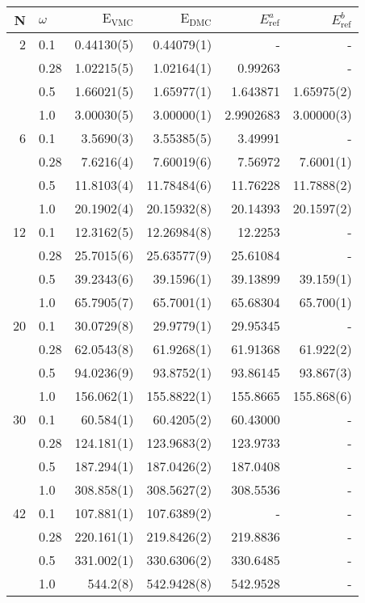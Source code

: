 \begin{table}
\label{tab:QDotsResultsAll}
\begin{center}
\begin{tabular}{rl|rrrr}
    N     & $\omega$ & $\mathrm{E_{VMC}}$ & $\mathrm{E_{DMC}}$ & $E_\mathrm{ref}^a$& $E_\mathrm{ref}^b$\\
\hline\hline
    2     &   0.1    & 0.44130(5)  & 0.44079(1)  &- & -           \\
          &   0.28   & 1.02215(5)  & 1.02164(1)  &0.99263 & -           \\
          &   0.5    & 1.66021(5)  & 1.65977(1)  &1.643871 & 1.65975(2) \\
          &   1.0    & 3.00030(5)  & 3.00000(1)  &2.9902683 & 3.00000(3)  \\
\hline
    6     &   0.1    &  3.5690(3)  &  3.55385(5)  &3.49991 & -          \\
          &   0.28   &  7.6216(4)  &  7.60019(6)  &7.56972 & 7.6001(1)  \\
          &   0.5    & 11.8103(4)  & 11.78484(6)  &11.76228 & 11.7888(2) \\
          &   1.0    & 20.1902(4)  & 20.15932(8)  &20.14393 & 20.1597(2) \\
\hline
    12    &   0.1    & 12.3162(5)  & 12.26984(8) &12.2253 & -           \\
          &   0.28   & 25.7015(6)  & 25.63577(9) &25.61084 & -          \\
          &   0.5    & 39.2343(6)  & 39.1596(1)  &39.13899 & 39.159(1)  \\
          &   1.0    & 65.7905(7)  & 65.7001(1)  &65.68304 & 65.700(1)  \\
\hline
    20    &   0.1    &  30.0729(8)  &  29.9779(1) &29.95345 & -         \\
          &   0.28   &  62.0543(8)  &  61.9268(1) &61.91368 & 61.922(2) \\
          &   0.5    &  94.0236(9)  &  93.8752(1) &93.86145 & 93.867(3) \\
          &   1.0    & 156.062(1)   & 155.8822(1) &155.8665 & 155.868(6) \\
\hline
    30    &   0.1    &  60.584(1)  &  60.4205(2) &60.43000& -  \\
          &   0.28   & 124.181(1)  & 123.9683(2) &123.9733 & -  \\
          &   0.5    & 187.294(1)  & 187.0426(2) &187.0408 & -  \\
          &   1.0    & 308.858(1)  & 308.5627(2) &308.5536 & -  \\
\hline
    42    &   0.1    & 107.881(1)  & 107.6389(2) &- & -  \\
          &   0.28   & 220.161(1)  & 219.8426(2) &219.8836 & -  \\
          &   0.5    & 331.002(1)  & 330.6306(2) &330.6485 & -  \\
          &   1.0    & 544.2(8)    & 542.9428(8) &542.9528 & -  \\
\hline\hline



\end{tabular}
\end{center}
\end{table}
